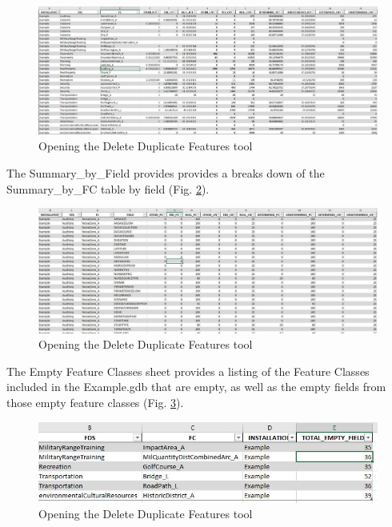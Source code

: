 \documentclass[openany]{book}
\theoremstyle{definition}
\theoremstyle{definition}
\theoremstyle{definition}
\theoremstyle{remark}
\begin{document}
\begin{figure}[H]

{\centering \includegraphics{figures/summIndt-sheet1} 

}

\caption{Opening the Delete Duplicate Features tool}\label{fig:summIndtsheet1}
\end{figure}

The Summary\_by\_Field provides provides a breaks down of the
Summary\_by\_FC table by field (Fig. \ref{fig:summIndtsheet2}).

\begin{figure}[H]

{\centering \includegraphics{figures/summIndt-sheet2} 

}

\caption{Opening the Delete Duplicate Features tool}\label{fig:summIndtsheet2}
\end{figure}

The Empty Feature Classes sheet provides a listing of the Feature
Classes included in the Example.gdb that are empty, as well as the empty
fields from those empty feature classes (Fig. \ref{fig:summIndtsheet3}).

\begin{figure}[H]

{\centering \includegraphics{figures/summIndt-sheet3} 

}

\caption{Opening the Delete Duplicate Features tool}\label{fig:summIndtsheet3}
\end{figure}
\end{document}
